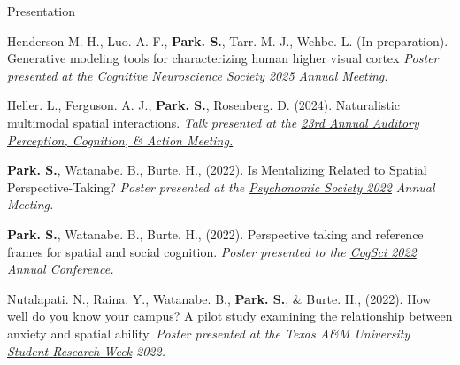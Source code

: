 \documentclass{resume} %
\begin{document}
\begin{rSection}{Presentation}
	\setlength{\hangingindent}{1.27cm}
	
	\begin{hangingpar}
		
		Henderson M. H., Luo. A. F., \textbf{Park. S.}, Tarr. M. J., Wehbe. L. (In-preparation). 
		Generative modeling tools for characterizing human higher visual cortex
		\em{Poster presented at the
			\href{https://www.cogneurosociety.org/poster/?id=6325}{Cognitive Neuroscience Society
				 2025} Annual Meeting.}
		
	\end{hangingpar}
	
	\begin{hangingpar}
		
		Heller. L., Ferguson. A. J., \textbf{Park. S.}, Rosenberg. D. (2024). 
		Naturalistic multimodal spatial interactions.
		\em{Talk presented at the
			\href{https://apcsociety.org/APCAM%202024%20Program.pdf#page=21.10}{23rd Annual Auditory Perception, Cognition, \& Action Meeting.}}
		
	\end{hangingpar}
	
	\begin{hangingpar}
		
		\textbf{Park. S.}, Watanabe. B., Burte. H., (2022). 
		Is Mentalizing Related to Spatial Perspective-Taking? 
		\em{Poster presented at the
			\href{https://www.psychonomic.org/page/2022annualmeeting}{Psychonomic
				Society 2022} Annual Meeting.}
		
	\end{hangingpar}
	
	\begin{hangingpar}
		
		\textbf{Park. S.}, Watanabe. B., Burte. H., (2022). 
		Perspective taking and reference frames for spatial and social 
		cognition. 
		\em{Poster presented to the
			\href{https://cognitivesciencesociety.org/cogsci-2022/}{CogSci 
				2022} Annual Conference.}
		
	\end{hangingpar}
	
	\begin{hangingpar}
		
		Nutalapati. N., Raina. Y., Watanabe. B., \textbf{Park. S.}, \& Burte. 
		H., (2022). 
		How well do you know your campus? A pilot study examining the 
		relationship between anxiety and spatial ability. 
		\em{Poster presented at the Texas A\&M University
			\href{https://srw.tamu.edu/}{Student Research Week} 2022.}
		

\end{hangingpar}
\end{rSection}
\end{document}
